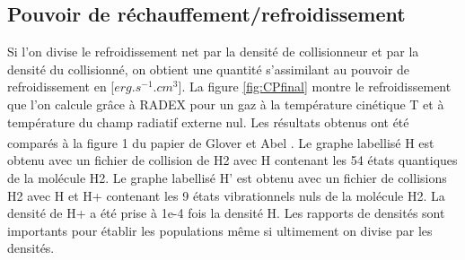 \documentclass[10pt, a4paper]{report}
\numberwithin{equation}{subsection}
\begin{document}

\subsection{Pouvoir de réchauffement/refroidissement}
Si l'on divise le refroidissement net par la densité de collisionneur et par la densité du collisionné, on obtient une quantité s'assimilant au pouvoir de refroidissement en [$erg.s^{-1}.cm^{3}$]. La figure \ref{fig:CPfinal} montre le refroidissement que l'on calcule grâce à RADEX pour un gaz à la température cinétique T et à température du champ radiatif externe nul. Les résultats obtenus ont été comparés à la figure 1 du papier de Glover et Abel \textsuperscript{\cite{Glover}}. Le graphe labellisé H est obtenu avec un fichier de collision de H2 avec H contenant les 54 états quantiques de la molécule H2. Le graphe labellisé H' est obtenu avec un fichier de collisions H2 avec H et H+ contenant les 9 états vibrationnels nuls de la molécule H2. La densité de H+ a été prise à 1e-4 fois la densité H. Les rapports de densités sont importants pour établir les populations même si ultimement on divise par les densités. 
\end{document}
